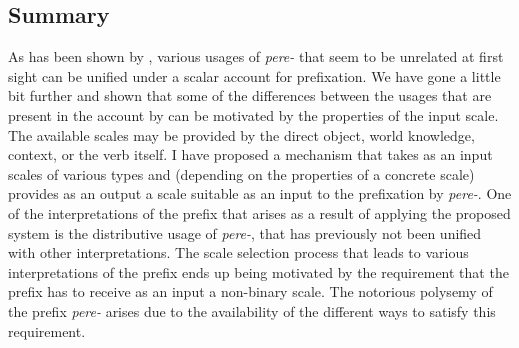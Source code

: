 %

\subsection{Summary}
As has been shown by \citet{Kagan:book}, various usages of \textit{pere-} that seem to be unrelated at first sight can be unified under a scalar account for prefixation. We have gone a little bit further and shown that some of the differences between the usages that are present in the account by \citet{Kagan:book} can be motivated by the properties of the input scale. The available scales may be provided by the direct object, world knowledge, context, or the verb itself. I have proposed a mechanism that takes as an input scales of various types and (depending on the properties of a concrete scale) provides as an output a scale suitable as an input to the prefixation by \textit{pere-}. One of the interpretations of the prefix that arises as a result of applying the proposed system is the distributive usage of \textit{pere-}, that has previously not been unified with other interpretations. The scale selection process that leads to various interpretations of the prefix ends up being motivated by the requirement that the prefix has to receive as an input a non-binary scale. The notorious polysemy of the prefix \textit{pere-} arises due to the availability of the different ways to satisfy this requirement. 

